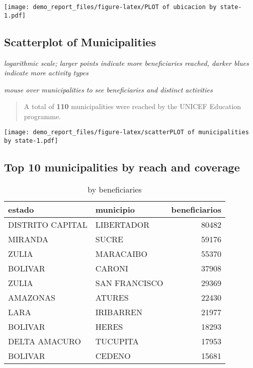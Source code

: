 \documentclass[
]{article}
\begin{document}
\texttt{[image: demo\_report\_files/figure-latex/PLOT of ubicacion by state-1.pdf]}

\hypertarget{scatterplot-of-municipalities}{%
\subsection{Scatterplot of
Municipalities}\label{scatterplot-of-municipalities}}

\emph{logarithmic scale; larger points indicate more beneficiaries
reached, darker blues indicate more activity types}

\emph{mouse over municipalities to see beneficiaries and distinct
activities}

\begin{quote}
A total of \textbf{110} municipalities were reached by the UNICEF
Education programme.
\end{quote}

\texttt{[image: demo\_report\_files/figure-latex/scatterPLOT of municipalities by state-1.pdf]}

\hypertarget{top-10-municipalities-by-reach-and-coverage}{%
\subsection{Top 10 municipalities by reach and
coverage}\label{top-10-municipalities-by-reach-and-coverage}}

\begin{wraptable}{l}{0pt}

\caption{\label{tab:municipalities top TABLE}by beneficiaries}
\centering
\begin{tabular}[t]{l|l|r}
\hline
estado & municipio & beneficiarios\\
\hline
DISTRITO CAPITAL & LIBERTADOR & 80482\\
\hline
MIRANDA & SUCRE & 59176\\
\hline
ZULIA & MARACAIBO & 55370\\
\hline
BOLIVAR & CARONI & 37908\\
\hline
ZULIA & SAN FRANCISCO & 29369\\
\hline
AMAZONAS & ATURES & 22430\\
\hline
LARA & IRIBARREN & 21977\\
\hline
BOLIVAR & HERES & 18293\\
\hline
DELTA AMACURO & TUCUPITA & 17953\\
\hline
BOLIVAR & CEDENO & 15681\\
\hline
\end{tabular}
\end{wraptable}
\end{document}
